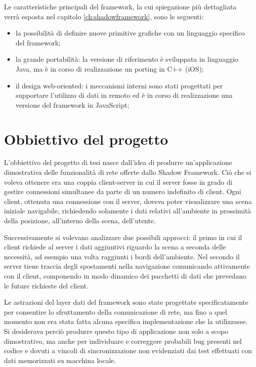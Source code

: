 Le caratteristiche principali del framework, la cui spiegazione pi\`u dettagliata verr\`a esposta nel capitolo  \ref{ch:shadowframework}, sono le seguenti:
\begin{itemize}
	\item  la possibilit\`a di definire nuove primitive grafiche con un linguaggio specifico del framework;
	\item  la grande portabilit\`a: la versione di riferimento \`e sviluppata in linguaggio Java, ma \`e in corso di realizzazione un porting in C++ (iOS);
	\item  il design web-oriented: i meccanismi interni sono stati progettati per supportare l'utilizzo di dati in remoto ed \`e in corso di realizzazione una versione del framework in JavaScript;
\end{itemize}

%
%
\section{Obbiettivo del progetto}
\label{sec:obbiettivo}
L'obbiettivo del progetto di tesi nasce dall'idea di produrre un'applicazione dimostrativa delle funzionalit\`a di rete offerte dallo Shadow Framework.
Ci\`o che si voleva ottenere era una coppia client-server in cui il server fosse in grado di gestire connessioni simultanee da parte di un numero indefinito di client. 
Ogni client, ottenuta una connessione con il server, doveva poter visualizzare una scena iniziale navigabile, richiedendo solamente i dati relativi all'ambiente in prossimit\`a della posizione, all'interno della scena, dell'utente.

Successivamente si volevano analizzare due possibili approcci: il primo in cui il client richiede al server i dati aggiuntivi riguardo la scena a seconda delle necessit\`a, ad esempio una volta raggiunti i bordi dell'ambiente. Nel secondo il server tiene traccia degli spostamenti nella navigazione comunicando attivamente con il client, componendo in modo dinamico dei pacchetti di dati che prevedano le future richieste del client.

Le astrazioni del layer dati del framework sono state progettate specificatamente per consentire lo sfruttamento della comunicazione di rete, ma fino a quel momento non era stata fatta alcuna specifica implementazione che la utilizzasse. Si desiderava perci\`o produrre questo tipo di applicazione non solo a scopo dimostrativo, ma anche per individuare e correggere probabili bug presenti nel codice e dovuti a vincoli di sincronizzazione non evidenziati dai test effettuati con dati memorizzati su macchina locale.

